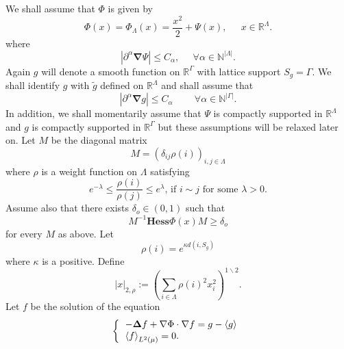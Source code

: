 \documentclass{article}
\begin{document}
We shall assume that $\Phi $ is given by 
\begin{equation}
\Phi (x)=\Phi _{\Lambda }(x)=\frac{x^{2}}{2}+\Psi (x),\;\ \ \ \ \;x\in 
\mathbb{R}^{\Lambda }.
\end{equation}%
where%
\begin{equation}
\left| \partial ^{\alpha }\mathbf{\nabla }\Psi \right| \leq C_{\alpha },\;\
\ \ \ \ \forall \alpha \in \mathbb{N}^{\left| \Lambda \right| }.
\end{equation}%
Again $g$ will denote a smooth function on $\mathbb{R}^{\Gamma }$ with
lattice support $S_{g}=\Gamma .$ We shall identify $g$ with $\tilde{g}$
defined on $\mathbb{R}^{\Lambda }$ and shall assume that%
\begin{equation}
\left| \partial ^{\alpha }\mathbf{\nabla }g\right| \leq C_{\alpha
}\;\;\;\;\;\;\;\;\forall \alpha \in \mathbb{N}^{\left| \Gamma \right| }.
\end{equation}%
In addition, we shall momentarily assume that $\Psi $ is compactly supported
in $\mathbb{R}^{\Lambda }$ and $g$ is compactly supported in $\mathbb{R}%
^{\Gamma }$ but these assumptions will be relaxed later on. Let $M$ be the
diagonal matrix%
\begin{equation*}
M=\left( \delta _{ij}\rho (i)\right) _{i,j\in \Lambda }
\end{equation*}%
where $\rho $ is a weight function on $\Lambda $ satisfying \ 
\begin{equation}
e^{-\lambda }\leq \frac{\rho \left( i\right) }{\rho (j)}\leq e^{\lambda }%
\text{, \ \ if }i\sim j\text{\ \ for some }\lambda >0.
\end{equation}%
Assume also that there exists $\delta _{o}\in (0,1)$ such that%
\begin{equation}
M^{-1}\mathbf{Hess}\Phi (x)M\geq \delta _{o}
\end{equation}%
for every $M$ as above.\newline
Let 
\begin{equation}
\rho (i)=e^{\kappa d(i,S_{g})}
\end{equation}%
where $\kappa $ is a positive. Define 
\begin{equation*}
\left| x\right| _{2,\rho }:=\left( \sum_{i\in \Lambda }\rho
(i)^{2}x_{i}^{2}\right) ^{1\backslash 2}.
\end{equation*}%
Let $f$ be the solution of the equation%
\begin{equation*}
\left\{ 
\begin{tabular}{l}
$-\mathbf{\Delta }f+\mathbf{\nabla }\Phi \cdot \mathbf{\nabla }%
f=g-\left\langle g\right\rangle $ \\ 
$\left\langle f\right\rangle _{L^{2}(\mu )}=0.$%
\end{tabular}%
\right.
\end{equation*}%
\end{document}
